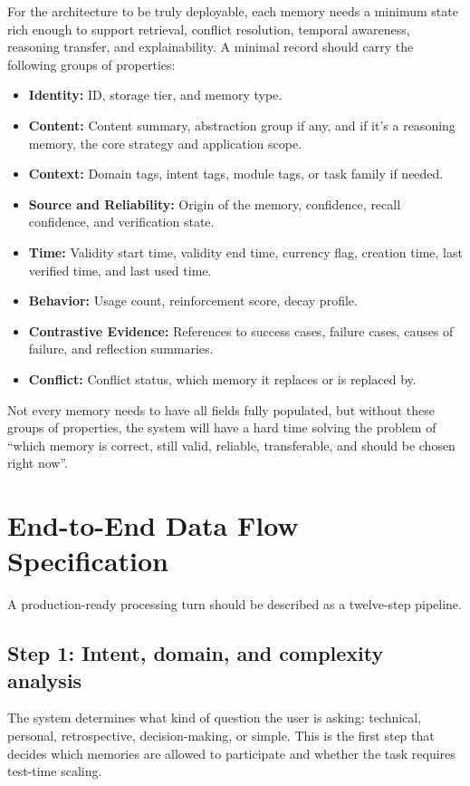\documentclass[a4paper,12pt]{article}
\begin{document}
For the architecture to be truly deployable, each memory needs a minimum state rich enough to support retrieval, conflict resolution, temporal awareness, reasoning transfer, and explainability. A minimal record should carry the following groups of properties:
\begin{itemize}
    \item \textbf{Identity:} ID, storage tier, and memory type.
    \item \textbf{Content:} Content summary, abstraction group if any, and if it's a reasoning memory, the core strategy and application scope.
    \item \textbf{Context:} Domain tags, intent tags, module tags, or task family if needed.
    \item \textbf{Source and Reliability:} Origin of the memory, confidence, recall confidence, and verification state.
    \item \textbf{Time:} Validity start time, validity end time, currency flag, creation time, last verified time, and last used time.
    \item \textbf{Behavior:} Usage count, reinforcement score, decay profile.
    \item \textbf{Contrastive Evidence:} References to success cases, failure cases, causes of failure, and reflection summaries.
    \item \textbf{Conflict:} Conflict status, which memory it replaces or is replaced by.
\end{itemize}

Not every memory needs to have all fields fully populated, but without these groups of properties, the system will have a hard time solving the problem of ``which memory is correct, still valid, reliable, transferable, and should be chosen right now''.

\section{End-to-End Data Flow Specification}

A production-ready processing turn should be described as a twelve-step pipeline.

\subsection*{Step 1: Intent, domain, and complexity analysis}

The system determines what kind of question the user is asking: technical, personal, retrospective, decision-making, or simple. This is the first step that decides which memories are allowed to participate and whether the task requires test-time scaling.
\end{document}
